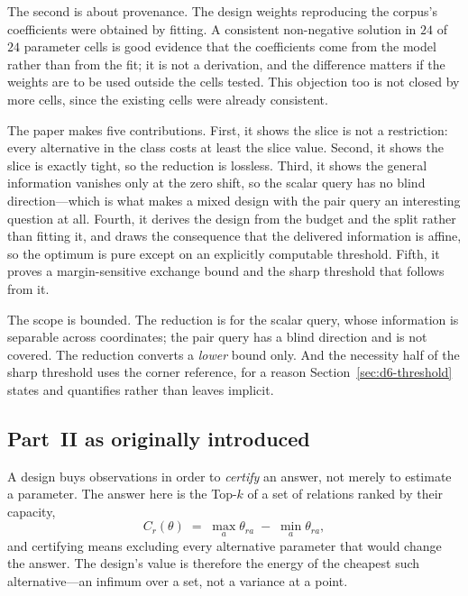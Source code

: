 The second is about provenance. The design weights reproducing the corpus's coefficients were
obtained by fitting. A consistent non-negative solution in $24$ of $24$ parameter cells is
good evidence that the coefficients come from the model rather than from the fit; it is not a
derivation, and the difference matters if the weights are to be used outside the cells
tested. This objection too is not closed by more cells, since the existing cells were already
consistent.

The paper makes five contributions. First, it shows the slice is not a restriction: every
alternative in the class costs at least the slice value. Second, it shows the slice is exactly
tight, so the reduction is lossless. Third, it shows the general information vanishes only at
the zero shift, so the scalar query has no blind direction---which is what makes a mixed
design with the pair query an interesting question at all. Fourth, it derives the design from
the budget and the split rather than fitting it, and draws the consequence that the delivered
information is affine, so the optimum is pure except on an explicitly computable threshold.
Fifth, it proves a margin-sensitive exchange bound and the sharp threshold that follows from
it.

The scope is bounded. The reduction is for the scalar query, whose information is separable
across coordinates; the pair query has a blind direction and is not covered. The reduction
converts a \emph{lower} bound only. And the necessity half of the sharp threshold uses the
corner reference, for a reason Section~\ref{sec:d6-threshold} states and quantifies rather than
leaves implicit.


\subsection{Part~II as originally introduced}


A design buys observations in order to \emph{certify} an answer, not merely to estimate a
parameter. The answer here is the Top-$k$ of a set of relations ranked by their capacity,
\begin{equation}
C_{r}(\theta)\;=\;\max_{a}\theta_{ra}\;-\;\min_{a}\theta_{ra},
\label{eq:fn-capacity}
\end{equation}
and certifying means excluding every alternative parameter that would change the answer. The
design's value is therefore the energy of the cheapest such alternative---an infimum over a
set, not a variance at a point.

